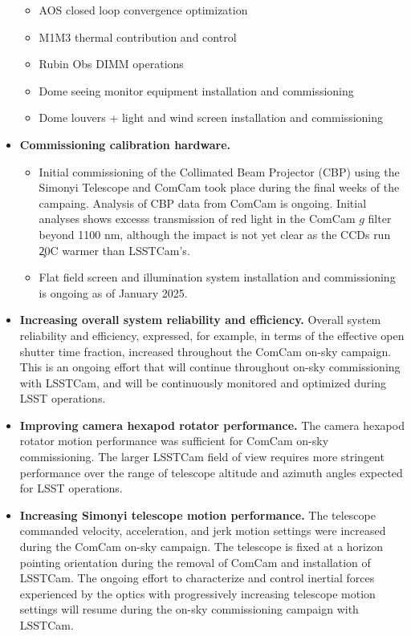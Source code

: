 \begin{itemize}
\begin{itemize}
        \item AOS closed loop convergence optimization
        \item M1M3 thermal contribution and control
        \item Rubin Obs DIMM operations
        \item Dome seeing monitor equipment installation and commissioning
        \item Dome louvers + light and wind screen installation and commissioning
    \end{itemize}
    \item \textbf{Commissioning calibration hardware.}
    \begin{itemize}
        \item Initial commissioning of the Collimated Beam Projector (CBP) using the Simonyi Telescope and
          ComCam took place during the final weeks of the campaing. Analysis of CBP data from ComCam is
          ongoing. Initial analyses shows excesss transmission of red light in the ComCam $g$ filter beyond
          1100 nm, although the impact is not yet clear as the \ComCam CCDs run \c 20C warmer than LSSTCam's.
        \item Flat field screen and illumination system installation and commissioning is ongoing as of January 2025.
    \end{itemize}
    \item \textbf{Increasing overall system reliability and efficiency.} Overall system reliability and efficiency, expressed, for example, in terms of the effective open shutter time fraction, increased throughout the ComCam on-sky campaign. This is an ongoing effort that will continue throughout on-sky commissioning with LSSTCam, and will be continuously monitored and optimized during LSST operations.
    \item \textbf{Improving camera hexapod rotator performance.} The camera hexapod rotator motion performance was sufficient for ComCam on-sky commissioning. The larger LSSTCam field of view requires more stringent performance over the range of telescope altitude and azimuth angles expected for LSST operations.
    \item \textbf{Increasing Simonyi telescope motion performance.} The telescope commanded velocity,
      acceleration, and jerk motion settings were increased during the ComCam on-sky campaign. The telescope is fixed at a horizon pointing orientation during the removal of ComCam and installation of LSSTCam. The ongoing effort to characterize and control inertial forces experienced by the optics with progressively increasing telescope motion settings will resume during the on-sky commissioning campaign with LSSTCam.
\end{itemize}